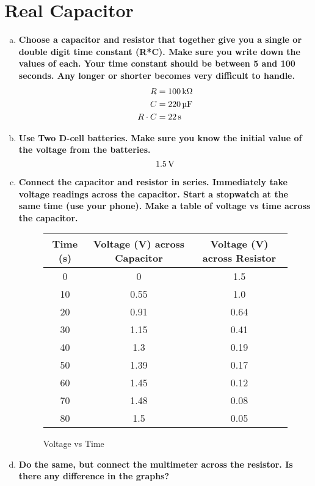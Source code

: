 \documentclass[article, 12pt]{article}
\begin{document}
    \section{Real Capacitor}
    \begin{enumerate}[a)]
        \item \textbf{Choose a capacitor and resistor that together give you a single or double digit time constant (R*C). Make sure you write down the values of each. Your time constant should be between 5 and 100 seconds. Any longer or shorter becomes very difficult to handle.}
        \begin{align}
            R &= \text{\SI{100}{\kilo\ohm}}\\
            C &= \text{\SI{220}{\micro\farad}}\\
            R \cdot C &= \text{\SI{22}{\second}}
        \end{align}
        \item \textbf{Use Two D-cell batteries. Make sure you know the initial value of the voltage from the batteries.}
        \begin{equation}
            \text{\SI{1.5}{\volt}}
        \end{equation}
        \item \textbf{Connect the capacitor and resistor in series. Immediately take voltage readings across the capacitor. Start a stopwatch at the same time (use your phone).  Make a table of voltage vs time across the capacitor.} 
        \begin{figure}[H]
            \centering
            \begin{tabular}{|c|c|c|}
                \hline
                Time (s) & Voltage (V) across Capacitor & Voltage (V) across Resistor \\
                \hline
                0 & 0 & 1.5 \\
                10 & 0.55 & 1.0 \\
                20 & 0.91 & 0.64 \\
                30 & 1.15 & 0.41 \\
                40 & 1.3 & 0.19 \\
                50 & 1.39 & 0.17 \\
                60 & 1.45 & 0.12 \\
                70 & 1.48 & 0.08 \\
                80 & 1.5 & 0.05 \\
                \hline
            \end{tabular}
            \caption{Voltage vs Time}
        \end{figure}
        \item \textbf{Do the same, but connect the multimeter across the resistor. Is there any difference in the graphs?}
        

\end{enumerate}
\end{document}
